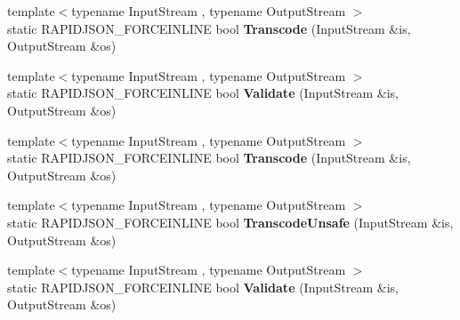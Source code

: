 \begin{DoxyCompactItemize}
\item 
\mbox{\label{structTranscoder_3_01Encoding_00_01Encoding_01_4_aad11cdc2b829123a7b9969e34d456813}} 
{\footnotesize template$<$typename Input\+Stream , typename Output\+Stream $>$ }\\static R\+A\+P\+I\+D\+J\+S\+O\+N\+\_\+\+F\+O\+R\+C\+E\+I\+N\+L\+I\+NE bool {\bfseries Transcode} (Input\+Stream \&is, Output\+Stream \&os)
\item 
\mbox{\label{structTranscoder_3_01Encoding_00_01Encoding_01_4_a536aa3930251161d05e112947ec2f9c8}} 
{\footnotesize template$<$typename Input\+Stream , typename Output\+Stream $>$ }\\static R\+A\+P\+I\+D\+J\+S\+O\+N\+\_\+\+F\+O\+R\+C\+E\+I\+N\+L\+I\+NE bool {\bfseries Validate} (Input\+Stream \&is, Output\+Stream \&os)
\item 
\mbox{\label{structTranscoder_3_01Encoding_00_01Encoding_01_4_aad11cdc2b829123a7b9969e34d456813}} 
{\footnotesize template$<$typename Input\+Stream , typename Output\+Stream $>$ }\\static R\+A\+P\+I\+D\+J\+S\+O\+N\+\_\+\+F\+O\+R\+C\+E\+I\+N\+L\+I\+NE bool {\bfseries Transcode} (Input\+Stream \&is, Output\+Stream \&os)
\item 
\mbox{\label{structTranscoder_3_01Encoding_00_01Encoding_01_4_addf67decfff7d0de510c47842eb53cef}} 
{\footnotesize template$<$typename Input\+Stream , typename Output\+Stream $>$ }\\static R\+A\+P\+I\+D\+J\+S\+O\+N\+\_\+\+F\+O\+R\+C\+E\+I\+N\+L\+I\+NE bool {\bfseries Transcode\+Unsafe} (Input\+Stream \&is, Output\+Stream \&os)
\item 
\mbox{\label{structTranscoder_3_01Encoding_00_01Encoding_01_4_a536aa3930251161d05e112947ec2f9c8}} 
{\footnotesize template$<$typename Input\+Stream , typename Output\+Stream $>$ }\\static R\+A\+P\+I\+D\+J\+S\+O\+N\+\_\+\+F\+O\+R\+C\+E\+I\+N\+L\+I\+NE bool {\bfseries Validate} (Input\+Stream \&is, Output\+Stream \&os)
\end{DoxyCompactItemize}


